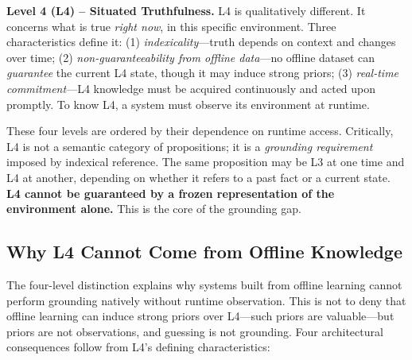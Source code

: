 \textbf{Level 4 (L4) -- Situated Truthfulness.} L4 is qualitatively different. It concerns what is true \emph{right now}, in this specific environment. Three characteristics define it: (1) \emph{indexicality}---truth depends on context and changes over time; (2) \emph{non-guaranteeability from offline data}---no offline dataset can \emph{guarantee} the current L4 state, though it may induce strong priors; (3) \emph{real-time commitment}---L4 knowledge must be acquired continuously and acted upon promptly. To know L4, a system must observe its environment at runtime.

These four levels are ordered by their dependence on runtime access. Critically, L4 is not a semantic category of propositions; it is a \emph{grounding requirement} imposed by indexical reference. The same proposition may be L3 at one time and L4 at another, depending on whether it refers to a past fact or a current state. \textbf{L4 cannot be guaranteed by a frozen representation of the environment alone.} This is the core of the grounding gap.

\subsection{Why L4 Cannot Come from Offline Knowledge}

The four-level distinction explains why systems built from offline learning cannot perform grounding natively without runtime observation. This is not to deny that offline learning can induce strong priors over L4---such priors are valuable---but priors are not observations, and guessing is not grounding. Four architectural consequences follow from L4's defining characteristics:

